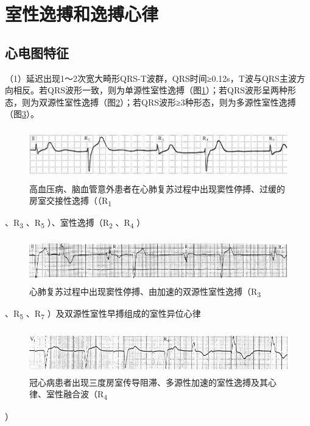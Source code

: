 \protect\hypertarget{text00019.htmlux5cux23subid186}{}{}

\section{室性逸搏和逸搏心律}

\protect\hypertarget{text00019.htmlux5cux23subid187}{}{}

\subsection{心电图特征}

（1）延迟出现1～2次宽大畸形QRS-T波群，QRS时间≥0.12s，T波与QRS主波方向相反。若QRS波形一致，则为单源性室性逸搏（图\ref{fig12-11}）；若QRS波形呈两种形态，则为双源性室性逸搏（图\ref{fig12-12}）；若QRS波形≥3种形态，则为多源性室性逸搏（图\ref{fig12-13}）。

\begin{figure}[!htbp]
 \centering
 \includegraphics[width=5.82292in,height=0.875in]{./images/Image00205.jpg}
 \captionsetup{justification=centering}
 \caption{高血压病、脑血管意外患者在心肺复苏过程中出现窦性停搏、过缓的房室交接性逸搏（（R\textsubscript{1}}
 \label{fig12-11}
  \end{figure} 
、R\textsubscript{3} 、R\textsubscript{5}
）、室性逸搏（R\textsubscript{2} 、R\textsubscript{4} ）

\begin{figure}[!htbp]
 \centering
 \includegraphics[width=5.58333in,height=0.75in]{./images/Image00206.jpg}
 \captionsetup{justification=centering}
 \caption{心肺复苏过程中出现窦性停搏、由加速的双源性室性逸搏（R\textsubscript{3}}
 \label{fig12-12}
  \end{figure} 
、R\textsubscript{5} 、R\textsubscript{7}
）及双源性室性早搏组成的室性异位心律

\begin{figure}[!htbp]
 \centering
 \includegraphics[width=5.58333in,height=0.75in]{./images/Image00207.jpg}
 \captionsetup{justification=centering}
 \caption{冠心病患者出现三度房室传导阻滞、多源性加速的室性逸搏及其心律、室性融合波（R\textsubscript{4}}
 \label{fig12-13}
  \end{figure} 
）

